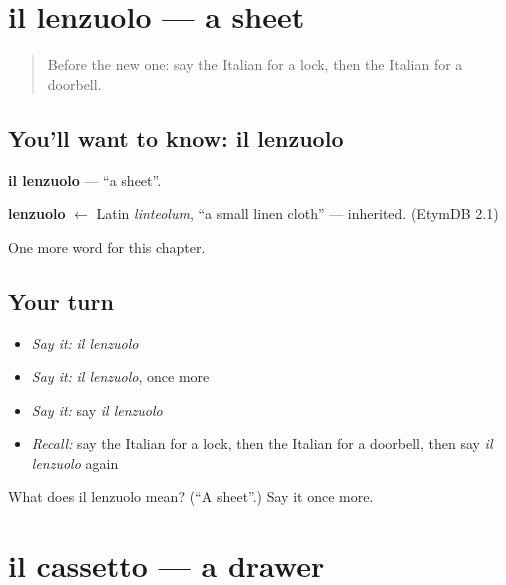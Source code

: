 \section[il lenzuolo]{il lenzuolo — a sheet}

\label{lesson:IT-C191-lenzuolo}



\begin{quote}
Before the new one: say the Italian for a lock, then the Italian for a doorbell.
\end{quote}

\subsection*{You'll want to know: il lenzuolo}
\textbf{il lenzuolo} — \textquotedblleft{}a sheet\textquotedblright{}.

\begin{cousinweb}
\textbf{lenzuolo} $\leftarrow$ Latin \emph{linteolum}, \textquotedblleft{}a small linen cloth\textquotedblright{} — inherited. (EtymDB 2.1)
\end{cousinweb}

\begin{grammarlens}[title={What you've built}]
One more word for this chapter.
\end{grammarlens}

\subsection*{Your turn}
\begin{itemize}
\raggedright
  \item \emph{Say it:} \emph{il lenzuolo}
  \item \emph{Say it:} \emph{il lenzuolo}, once more
  \item \emph{Say it:} say \emph{il lenzuolo}
  \item \emph{Recall:} say the Italian for a lock, then the Italian for a doorbell, then say \emph{il lenzuolo} again
\end{itemize}

\begin{tcolorbox}[breakable,colback=teal!4,colframe=teal!35!black,title={Before you move on}]
What does il lenzuolo mean? (\textquotedblleft{}A sheet\textquotedblright{}.) Say it once more.
\end{tcolorbox}
\section[il cassetto]{il cassetto — a drawer}

